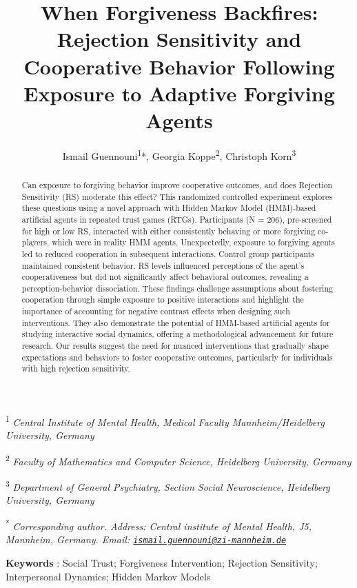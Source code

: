 \documentclass[
]{article}
\title{When Forgiveness Backfires: Rejection Sensitivity and Cooperative Behavior Following Exposure to Adaptive Forgiving Agents}
\author{Ismail Guennouni\textsuperscript{1}*, Georgia Koppe\textsuperscript{2}, Christoph Korn\textsuperscript{3}}
\date{}
\begin{document}
\maketitle
\begin{abstract}
Can exposure to forgiving behavior improve cooperative outcomes, and does Rejection Sensitivity (RS) moderate this effect? This randomized controlled experiment explores these questions using a novel approach with Hidden Markov Model (HMM)-based artificial agents in repeated trust games (RTGs). Participants (N = 206), pre-screened for high or low RS, interacted with either consistently behaving or more forgiving co-players, which were in reality HMM agents. Unexpectedly, exposure to forgiving agents led to reduced cooperation in subsequent interactions. Control group participants maintained consistent behavior. RS levels influenced perceptions of the agent's cooperativeness but did not significantly affect behavioral outcomes, revealing a perception-behavior dissociation. These findings challenge assumptions about fostering cooperation through simple exposure to positive interactions and highlight the importance of accounting for negative contrast effects when designing such interventions. They also demonstrate the potential of HMM-based artificial agents for studying interactive social dynamics, offering a methodological advancement for future research. Our results suggest the need for nuanced interventions that gradually shape expectations and behaviors to foster cooperative outcomes, particularly for individuals with high rejection sensitivity.
\end{abstract}

\small

\textsuperscript{1} \emph{Central Institute of Mental Health, Medical Faculty Mannheim/Heidelberg University, Germany}

\textsuperscript{2} \emph{Faculty of Mathematics and Computer Science, Heidelberg University, Germany}

\textsuperscript{3} \emph{Department of General Psychiatry, Section Social Neuroscience, Heidelberg University, Germany}

\textsuperscript{*} \emph{Corresponding author. Address: Central institute of Mental Health, J5, Mannheim, Germany. Email: \href{mailto:ismail.guennouni@zi-mannheim.de}{\nolinkurl{ismail.guennouni@zi-mannheim.de}}}

\vspace{1cm}

\textbf{Keywords} : Social Trust; Forgiveness Intervention; Rejection Sensitivity; Interpersonal Dynamics; Hidden Markov Models
\end{document}

